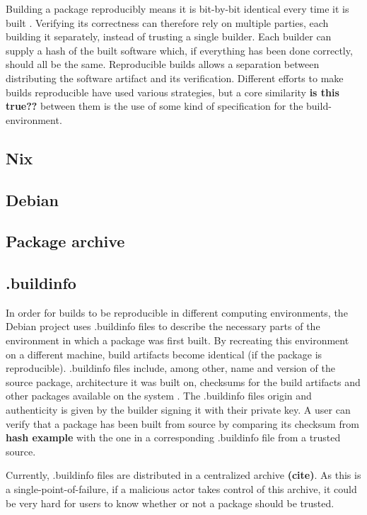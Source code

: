 \documentclass[english, biblatex, digitaloutput]{kththesis}
\begin{document}
Building a package reproducibly means it is bit-by-bit identical every time it is built \cite{lamb_reproducible_2021}. Verifying its correctness can therefore rely on multiple parties, each building it separately, instead of trusting a single builder. Each builder can supply a hash of the built software which, if everything has been done correctly, should all be the same. Reproducible builds allows a separation between distributing the software artifact and its verification. Different efforts to make builds reproducible have used various strategies, but a core similarity \textbf{is this true??} between them is the use of some kind of specification for the build-environment.

\subsection{Nix}

\subsection{Debian}

\subsection{Package archive}

\subsection{.buildinfo}

In order for builds to be reproducible in different computing environments, the Debian project uses .buildinfo files to describe the necessary parts of the environment in which a package was first built. By recreating this environment on a different machine, build artifacts become identical (if the package is reproducible). .buildinfo files include, among other, name and version of the source package, architecture it was built on, checksums for the build artifacts and other packages available on the system \cite{lamb_reproducible_2021}. The .buildinfo files origin and authenticity is given by the builder signing it with their private  key. A user can verify that a package has been built from source by comparing its checksum from \textbf{hash example} with the one in a corresponding .buildinfo file from a trusted source.

Currently, .buildinfo files are distributed in a centralized archive \textbf{(cite)}. As this is a single-point-of-failure, if a malicious actor takes control of this archive, it could be very hard for users to know whether or not a package should be trusted.
\end{document}
